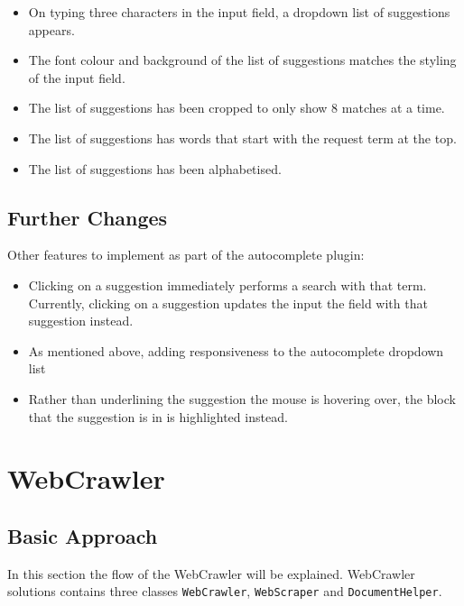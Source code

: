 \begin{itemize}
    \item On typing three characters in the input field, a dropdown list of suggestions appears.
    \item The font colour and background of the list of suggestions matches the styling of the input field.
    \item The list of suggestions has been cropped to only show 8 matches at a time.
    \item The list of suggestions has words that start with the request term at the top.
    \item The list of suggestions has been alphabetised.
\end{itemize}

\subsection{Further Changes}
Other features to implement as part of the autocomplete plugin:

\begin{itemize}
    \item Clicking on a suggestion immediately performs a search with that term. Currently, clicking on a suggestion updates the input the field with that suggestion instead.
    \item As mentioned above, adding responsiveness to the autocomplete dropdown list
    \item Rather than underlining the suggestion the mouse is hovering over, the block that the suggestion is in is highlighted instead.
\end{itemize}

\section{WebCrawler}
\subsection{Basic Approach}

In this section the flow of the WebCrawler will be explained.  
WebCrawler solutions contains three classes {\tt WebCrawler}, {\tt WebScraper} and {\tt DocumentHelper}.

